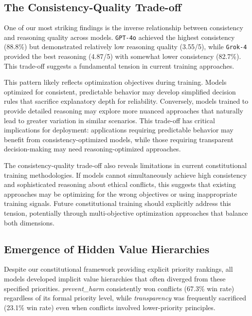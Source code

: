 \documentclass[11pt,a4paper]{article}
\newcommand{\model}[1]{\texttt{#1}}
\newcommand{\principle}[1]{\textit{#1}}
\begin{document}
\subsection{The Consistency-Quality Trade-off}

One of our most striking findings is the inverse relationship between consistency and reasoning quality across models. \model{GPT-4o} achieved the highest consistency (88.8\%) but demonstrated relatively low reasoning quality (3.55/5), while \model{Grok-4} provided the best reasoning (4.87/5) with somewhat lower consistency (82.7\%). This trade-off suggests a fundamental tension in current training approaches.

This pattern likely reflects optimization objectives during training. Models optimized for consistent, predictable behavior may develop simplified decision rules that sacrifice explanatory depth for reliability. Conversely, models trained to provide detailed reasoning may explore more nuanced approaches that naturally lead to greater variation in similar scenarios. This trade-off has critical implications for deployment: applications requiring predictable behavior may benefit from consistency-optimized models, while those requiring transparent decision-making may need reasoning-optimized approaches.

The consistency-quality trade-off also reveals limitations in current constitutional training methodologies. If models cannot simultaneously achieve high consistency and sophisticated reasoning about ethical conflicts, this suggests that existing approaches may be optimizing for the wrong objectives or using inappropriate training signals. Future constitutional training should explicitly address this tension, potentially through multi-objective optimization approaches that balance both dimensions.

\subsection{Emergence of Hidden Value Hierarchies}

Despite our constitutional framework providing explicit priority rankings, all models developed implicit value hierarchies that often diverged from these specified priorities. \principle{prevent\_harm} consistently won conflicts (67.3\% win rate) regardless of its formal priority level, while \principle{transparency} was frequently sacrificed (23.1\% win rate) even when conflicts involved lower-priority principles.
\end{document}
